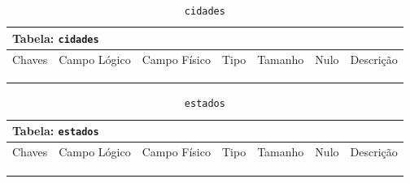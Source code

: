 \documentclass[12pt,a4paper]{article}
\begin{document}
\begin{center}
\begin{table}[h!]
	\caption{\texttt{cidades}}
	\label{tabela:cidades}
	\begin{tabular}{|p{1cm}|p{1.5cm}|p{1.25cm}|p{1.25cm}|p{1.75cm}|p{1.25cm}|p{4.5cm}|}\hline	
		\multicolumn{7}{|p{16cm}|}{\cellcolor{cinzaClaro}  \centering Tabela: \texttt{cidades}} \\ \hline %
		{\small Chaves} & {\small Campo Lógico} & {\small Campo Físico} & {\small Tipo} & {\small Tamanho} & {\small Nulo} & {\small Descrição}\\\hline %
		
		{\tiny } & {\tiny } & {\tiny } & {\tiny } & {\tiny } & {\tiny } &{\tiny }\\\hline
		{\tiny } & {\tiny } & {\tiny } & {\tiny } & {\tiny } & {\tiny } &{\tiny }\\\hline
		{\tiny } & {\tiny } & {\tiny } & {\tiny } & {\tiny } & {\tiny } &{\tiny }\\\hline
		
			
	\end{tabular}
\end{table}	
\end{center}

\begin{center}
\begin{table}[h!]
	\caption{\texttt{estados}}
	\label{tabela:estados}
	\begin{tabular}{|p{1cm}|p{1.5cm}|p{1.25cm}|p{1.25cm}|p{1.75cm}|p{1.25cm}|p{4.5cm}|}\hline	
		\multicolumn{7}{|p{16cm}|}{\cellcolor{cinzaClaro}  \centering Tabela: \texttt{estados}} \\ \hline %
		{\small Chaves} & {\small Campo Lógico} & {\small Campo Físico} & {\small Tipo} & {\small Tamanho} & {\small Nulo} & {\small Descrição}\\\hline %
		
		{\tiny } & {\tiny } & {\tiny } & {\tiny } & {\tiny } & {\tiny } &{\tiny }\\\hline
		{\tiny } & {\tiny } & {\tiny } & {\tiny } & {\tiny } & {\tiny } &{\tiny }\\\hline
		{\tiny } & {\tiny } & {\tiny } & {\tiny } & {\tiny } & {\tiny } &{\tiny }\\\hline
		
			
	\end{tabular}
\end{table}	
\end{center}
\end{document}
